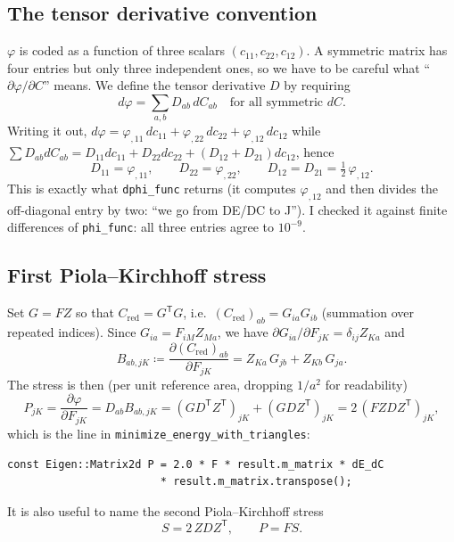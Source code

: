 \documentclass[11pt,a4paper]{article}
\theoremstyle{remark}
\newcommand{\Cred}{C_{\mathrm{red}}}
\newcommand{\T}{^{\mathsf T}}
\newcommand{\code}[1]{\texttt{#1}}
\begin{document}
\subsection{The tensor derivative convention}

$\varphi$ is coded as a function of three scalars $(c_{11},c_{22},c_{12})$. A symmetric
matrix has four entries but only three independent ones, so we have to be careful what
``$\partial\varphi/\partial C$'' means. We define the tensor derivative $D$ by requiring
\begin{equation}
d\varphi = \sum_{a,b} D_{ab}\, dC_{ab}\quad\text{for all symmetric } dC.
\end{equation}
Writing it out, $d\varphi = \varphi_{,11}\,dc_{11} + \varphi_{,22}\,dc_{22} + \varphi_{,12}\,dc_{12}$
while $\sum D_{ab}dC_{ab} = D_{11}dc_{11}+D_{22}dc_{22}+(D_{12}+D_{21})dc_{12}$, hence
\begin{equation}
D_{11}=\varphi_{,11},\qquad D_{22}=\varphi_{,22},\qquad D_{12}=D_{21}=\tfrac12\,\varphi_{,12}.
\label{eq:D}
\end{equation}
This is exactly what \code{dphi\_\allowbreak{}func} returns (it computes $\varphi_{,12}$ and then divides
the off-diagonal entry by two: ``we go from DE/DC to J''). I checked it against finite
differences of \code{phi\_\allowbreak{}func}: all three entries agree to $10^{-9}$.

\subsection{First Piola--Kirchhoff stress}

Set $G = FZ$ so that $\Cred = G\T G$, i.e.\ $(\Cred)_{ab} = G_{ia}G_{ib}$ (summation over
repeated indices). Since $G_{ia}=F_{iM}Z_{Ma}$, we have
$\partial G_{ia}/\partial F_{jK} = \delta_{ij}Z_{Ka}$ and
\begin{equation}
B_{ab,jK} \coloneqq \frac{\partial (\Cred)_{ab}}{\partial F_{jK}}
= Z_{Ka}\,G_{jb} + Z_{Kb}\,G_{ja}.
\label{eq:B}
\end{equation}
The stress is then (per unit reference area, dropping $1/a^2$ for readability)
\begin{equation}
P_{jK} = \frac{\partial\varphi}{\partial F_{jK}} = D_{ab}B_{ab,jK}
= (G D\T Z\T)_{jK} + (G D Z\T)_{jK} = 2\,(F Z D Z\T)_{jK},
\label{eq:P}
\end{equation}
which is the line in \code{minimize\_\allowbreak{}energy\_\allowbreak{}with\_\allowbreak{}triangles}:
\begin{lstlisting}
const Eigen::Matrix2d P = 2.0 * F * result.m_matrix * dE_dC
                        * result.m_matrix.transpose();
\end{lstlisting}
It is also useful to name the second Piola--Kirchhoff stress
\begin{equation}
S = 2\,Z D Z\T,\qquad P = FS.
\end{equation}
\end{document}
